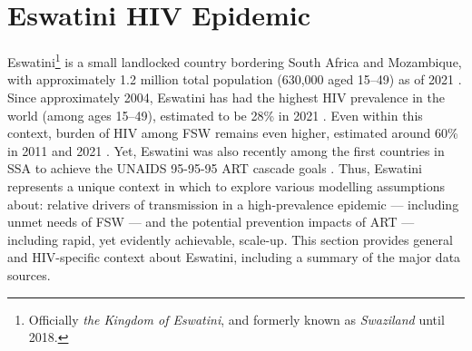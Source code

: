 \section{Eswatini HIV Epidemic}\label{intro.esw}
Eswatini\footnote{Officially \emph{the Kingdom of Eswatini},
  and formerly known as \emph{Swaziland} until 2018.}
is a small landlocked country bordering South Africa and Mozambique,
with approximately 1.2 million total population (630,000 aged 15--49) as of 2021 \cite{DataBank}.
Since approximately 2004, Eswatini has had
the highest HIV prevalence in the world (among ages 15--49),
estimated to be 28\% in 2021 \cite{DataBank,AIDSinfo}.
Even within this context, burden of HIV among FSW remains even higher,
estimated around 60\% in 2011 and 2021 \cite{Baral2014,EswIBBS2022}.
Yet, Eswatini was also recently among the first countries in SSA
to achieve the UNAIDS 95-95-95 ART cascade goals \cite{959595,AIDSinfo}.
Thus, Eswatini represents a unique context in which to explore
various modelling assumptions about:
relative drivers of transmission in a high-prevalence epidemic --- including unmet needs of FSW ---
and the potential prevention impacts of ART --- including rapid, yet evidently achievable, scale-up.
This section provides general and HIV-specific context about Eswatini,
including a summary of the major data sources.
